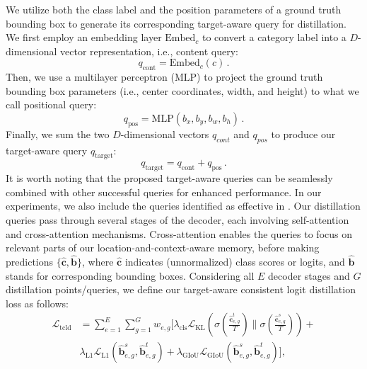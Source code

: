 We utilize both the class label and the position parameters of a ground truth bounding box to generate its corresponding target-aware query for distillation. 
We first employ an embedding layer $\text{Embed}_c$ to convert a category label into a $D$-dimensional vector representation, i.e., content query:
\begin{equation}
    q_{\text{cont}} = \text{Embed}_c(c) \,.
\end{equation}
\noindent Then, we use a multilayer perceptron ($\text{MLP}$) to project the ground truth bounding box parameters (i.e., center coordinates, width, and height) to what we call positional query:
\begin{equation}
    q_{\text{pos}} = \text{MLP}\left(b_{x}, b_{y}, b_{w}, b_{h}\right) \,.
\end{equation}
\noindent Finally, we sum the two $D$-dimensional vectors $q_{cont}$ and $q_{pos}$ to produce our target-aware query $q_{\text{target}}$:
\begin{equation}
q_{\text{target}} = q_{\text{cont}} + q_{\text{pos}} \,.
\end{equation}
It is worth noting that the proposed target-aware queries can be seamlessly combined with other successful queries for enhanced performance. In our experiments, we also include the queries identified as effective in \cite{wang2024knowledge}.
Our distillation queries pass through several stages of the decoder, each involving self-attention and cross-attention mechanisms. Cross-attention enables the queries to focus on relevant parts of our location-and-context-aware memory, before making predictions $\{\hat{\mathbf{c}}, \hat{\mathbf{b}}\}$, where $\hat{\mathbf{c}}$ indicates (unnormalized) class scores or logits, and $\hat{\mathbf{b}}$ stands for corresponding bounding boxes.
Considering all $E$ decoder stages and $G$ distillation points/queries, we define our target-aware consistent logit distillation loss as follows:
\begin{equation}\label{eq:tcld}
\begin{aligned}
\mathcal{L}_{\text{tcld}} & = \sum_{e=1}^E\sum_{g=1}^{G} w_{e,g} [ \lambda_{\text{cls}} \mathcal{L}_{\text{KL}} (\sigma(\frac{\hat{\mathbf{c}}_{e,g}^t}{T}) \parallel \sigma(\frac{\hat{\mathbf{c}}_{e,g}^s}{T})) + \\
&\lambda_{\text{L1}} \mathcal{L}_{\text{L1}} (\hat{\mathbf{b}}_{e,g}^s, \hat{\mathbf{b}}_{e,g}^t) 
+ \lambda_{\text{GIoU}} \mathcal{L}_{\text{GIoU}} (\hat{\mathbf{b}}_{e,g}^s, \hat{\mathbf{b}}_{e,g}^t)],
\end{aligned}
\end{equation}
